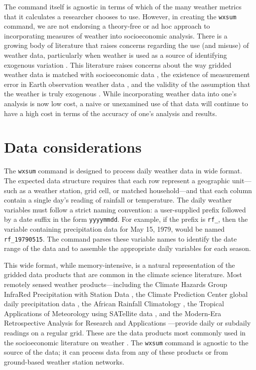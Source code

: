 The command itself is agnostic in terms of which of the many weather metrics that it calculates a researcher chooses to use. However, in creating the \texttt{wxsum} command, we are not endorsing a theory-free or ad hoc approach to incorporating measures of weather into socioeconomic analysis. There is a growing body of literature that raises concerns regarding the use (and misuse) of weather data, particularly when weather is used as a source of identifying exogenous variation \citep{BenamiEtAl26}. This literature raises concerns about the way gridded weather data is matched with socioeconomic data \citep{MichlerEtAl22}, the existence of measurement error in Earth observation weather data \cite{JosephsonEtAl26}, and the validity of the assumption that the weather is truly exogenous \citep{Sarsons15, Mellon2023-un}. While incorporating weather data into one's analysis is now low cost, a naive or unexamined use of that data will continue to have a high cost in terms of the accuracy of one's analysis and results.

\section{Data considerations}

The \texttt{wxsum} command is designed to process daily weather data in wide format. The expected data structure requires that each row represent a geographic unit---such as a weather station, grid cell, or matched household---and that each column contain a single day's reading of rainfall or temperature. The daily weather variables must follow a strict naming convention: a user-supplied prefix followed by a date suffix in the form \texttt{yyyymmdd}. For example, if the prefix is \texttt{rf\_}, then the variable containing precipitation data for May 15, 1979, would be named \texttt{rf\_19790515}. The command parses these variable names to identify the date range of the data and to assemble the appropriate daily variables for each season.

This wide format, while memory-intensive, is a natural representation of the gridded data products that are common in the climate science literature. Most remotely sensed weather products---including the Climate Hazards Group InfraRed Precipitation with Station Data \citep[CHIRPS;][]{CHIRPS}, the Climate Prediction Center global daily precipitation data \citep[CPC;][]{CPC}, the African Rainfall Climatology \citep[ARC2;][]{ARC2}, the Tropical Applications of Meteorology using SATellite data \citep[TAMSAT;][]{TAMSAT}, and the Modern-Era Retrospective Analysis for Research and Applications \citep[MERRA-2;][]{MERRA2}---provide daily or subdaily readings on a regular grid. These are the data products most commonly used in the socioeconomic literature on weather \citep{Dell2014-rf}. The \texttt{wxsum} command is agnostic to the source of the data; it can process data from any of these products or from ground-based weather station networks.

